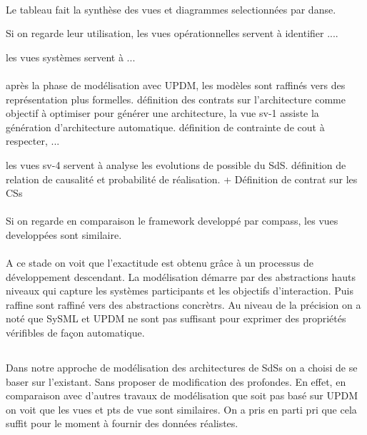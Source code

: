 \paragraph{} 
Le tableau fait la synthèse des vues et diagrammes selectionnées par
danse.
 
Si on regarde leur utilisation, les vues opérationnelles servent à
identifier .... 

les vues systèmes servent à ...

\paragraph{}
après la phase de modélisation avec UPDM, les modèles sont raffinés
vers des représentation plus formelles. définition des contrats sur
l'architecture comme objectif à optimiser pour générer une architecture, 
la vue sv-1 assiste la génération d'architecture automatique.
définition de contrainte de cout à respecter, ...

les vues sv-4 servent à analyse les evolutions de possible du SdS.
définition de relation de causalité et probabilité de réalisation. 
+ Définition de contrat sur les CSs 

\paragraph{}
Si on regarde en comparaison le framework developpé par compass, les
vues developpées sont similaire.
 
\paragraph{}
A ce stade on voit que l'exactitude est obtenu grâce à un processus de
développement descendant. La modélisation démarre par des abstractions
hauts niveaux qui capture les systèmes participants et les objectifs
d'interaction. Puis raffine sont raffiné vers des abstractions
concrètrs. 
Au niveau de la précision on a noté que SySML et UPDM ne sont pas
suffisant pour exprimer des propriétés vérifibles de façon automatique. 


\subsection{}

\paragraph{}
Dans notre approche de modélisation des architectures de SdSs on a
choisi de se baser sur l'existant. Sans proposer de modification des
profondes. En effet, en comparaison avec d'autres travaux de
modélisation que soit pas basé sur UPDM on voit que les vues et pts de
vue sont similaires. On a pris en parti pri que cela suffit pour le
moment à fournir des données réalistes. 



